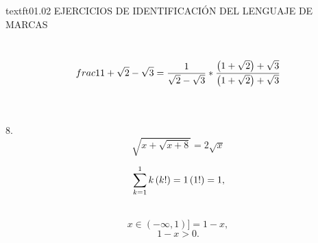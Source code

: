 \documentclass[10]{article}
\begin{document}
	\begin{tittle}
		\LARGE textft{01.02 EJERCICIOS DE IDENTIFICACIÓN DEL LENGUAJE DE MARCAS}
	\end{tittle}

\\ 
\begin{equation}
	\\frac{1}{1+\sqrt{2}-\sqrt{3}}=\frac{1}{\sqrt{2}-\sqrt{3}}*\frac{\left(1+\sqrt{2}\right)+\sqrt{3}}{\left(1+\sqrt{2}\right)+\sqrt{3}}
\end {equation}

\\\\8.  \begin{equation} \sqrt{x+\sqrt{x+8}}=2\sqrt{x} \end{equation} 

\begin{equation}
	\\\sum_{k=1}^{1}k\left(k!\right)=1\left(1!\right)=1,
\end{equation}

\\ \begin{equation} x\in\left(-\infty,1\right)]=1-x, \end{equation}  \begin{equation} 1-x>0.\end{equation} 
\end{document}

